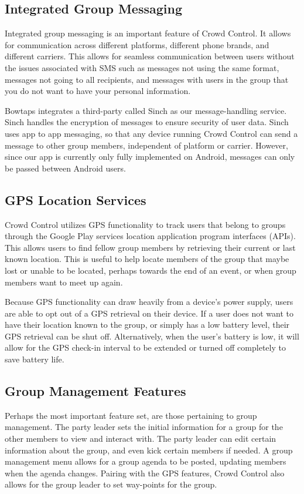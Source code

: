 \subsection{Integrated Group Messaging}
Integrated group messaging is an important feature of Crowd Control. It allows for communication across different platforms, different phone brands, and different carriers. This allows for seamless communication between users without the issues associated with SMS such as messages not using the same format, messages not going to all recipients, and messages with users in the group that you do not want to have your personal information.

Bowtaps integrates a third-party called Sinch as our message-handling service. Sinch handles the encryption of messages to ensure security of user data. Sinch uses app to app messaging, so that any device running Crowd Control can send a message to other group members, independent of platform or carrier. However, since our app is currently only fully implemented on Android, messages can only be passed between Android users.

\subsection{GPS Location Services}
Crowd Control utilizes GPS functionality to track users that belong to groups through the Google Play services location application program interfaces (APIs). This allows users to find fellow group members by retrieving their current or last known location. This is useful to help locate members of the group that maybe lost or unable to be located, perhaps towards the end of an event, or when group members want to meet up again.

Because GPS functionality can draw heavily from a device's power supply, users are able to opt out of a GPS retrieval on their device. If a user does not want to have their location known to the group, or simply has a low battery level, their GPS retrieval can be shut off. Alternatively, when the user's battery is low, it will allow for the GPS check-in interval to be extended or turned off completely to save battery life.

\subsection{Group Management Features}
Perhaps the most important feature set, are those pertaining to group management. The party leader sets the initial information for a group for the other members to view and interact with. The party leader can edit certain information about the group, and even kick certain members if needed. A group management menu allows for a group agenda to be posted, updating members when the agenda changes. Pairing with the GPS features, Crowd Control also allows for the group leader to set way-points for the group.  

